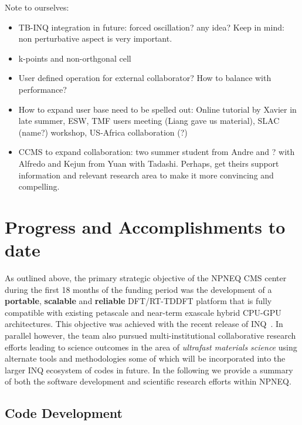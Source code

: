 {\color{green}
Note to ourselves:
\begin{itemize}
    \item TB-INQ integration in future: forced oscillation? any idea? Keep in mind: non perturbative aspect is very important.
    \item k-points and non-orthgonal cell
    \item User defined operation for external collaborator? How to balance with performance?
    \item How to expand user base need to be spelled out: Online tutorial by Xavier in late summer, ESW, TMF users meeting (Liang gave us material), SLAC (name?) workshop, US-Africa collaboration (?)
    \item CCMS to expand collaboration: two summer student from Andre and ? with Alfredo and Kejun from Yuan with Tadashi. Perhaps, get theirs support information and relevant research area to make it more convincing and compelling.
\end{itemize}

}
\clearpage

\section{Progress and Accomplishments to date} 
As outlined above, the primary strategic objective of the NPNEQ CMS center during the first 18 months of the funding period was the development of a \textbf{portable}, \textbf{scalable} and \textbf{reliable} DFT/RT-TDDFT platform that is fully compatible with existing petascale and near-term exascale hybrid CPU-GPU architectures. This objective was achieved with the recent release of \textsc{INQ}~\cite{Andrade2021}. In parallel however, the team also pursued multi-institutional collaborative research efforts leading to science outcomes in the area of \textit{ultrafast materials science} using alternate tools and methodologies some of which will be incorporated into the larger INQ ecosystem of codes in future. In the following we provide a summary of both the software development and scientific research efforts within NPNEQ.   
\subsection{Code Development}
